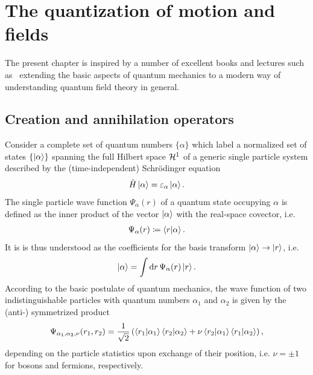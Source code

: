 \chapter{The quantization of motion and fields}
\label{ch:the_quantization_of_motion_and_fields}
The present chapter is inspired by a number of excellent books and lectures such as~\cite{AshcroftMermin1978,AltlandSimons2010,BruusFlensberg2004,Czycholl2016,FetterWalecka2003,Giamarchi2003,Rizzi2016,Burrello2020} extending the basic aspects of quantum mechanics to a modern way of understanding quantum field theory in general.
%
%
\section{Creation and annihilation operators}
\label{sec:creation_and_annihilation_operators}
%
%
Consider a complete set of quantum numbers $\{\alpha\}$ which label a normalized set of states $\{\ket{\alpha}\}$ spanning the full Hilbert space $\mathcal{H}^1$ of a generic single particle system described by the (time-independent) Schrödinger equation
\begin{align}
    \hat H \ket{\alpha} = \varepsilon_\alpha\ket{\alpha}.
\end{align}
The single particle wave function $\Psi_\alpha(r)$ of a quantum state occupying $\alpha$ is defined as the inner product of the vector $\ket{\alpha}$ with the real-space covector, i.e.
\begin{align}
    \Psi_\alpha(r) \coloneqq \braket{r|\alpha}.
\end{align}
It is is thus understood as the coefficients for the basis transform $\ket{\alpha}\rightarrow\ket{r}$, i.e.
\begin{align}
    \ket{\alpha} = \int{\rm d}{r}\, \Psi_\alpha(r) \ket{r}.
\end{align}
According to the basic postulate of quantum mechanics, the wave function of two indistinguishable particles with quantum numbers $\alpha_1$ and $\alpha_2$ is given by the (anti-) symmetrized product
\begin{align}
    \Psi_{\alpha_1,\alpha_2,\nu}(r_1,r_2) = \frac1{\sqrt2}\left(\braket{r_1|\alpha_1}\braket{r_2|\alpha_2} + \nu\braket{r_2|\alpha_1}\braket{r_1|\alpha_2}\right),
\end{align}
depending on the particle statistics upon exchange of their position, i.e. $\nu=\pm1$ for bosons and fermions, respectively.
